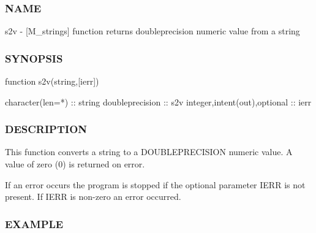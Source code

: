 \subsubsection*{N\+A\+ME}

s2v -\/ \mbox{[}M\+\_\+strings\mbox{]} function returns doubleprecision numeric value from a string 

\subsubsection*{S\+Y\+N\+O\+P\+S\+IS}

\begin{DoxyVerb}function s2v(string,[ierr])

 character(len=*)             :: string
 doubleprecision              :: s2v
 integer,intent(out),optional :: ierr
\end{DoxyVerb}


\subsubsection*{D\+E\+S\+C\+R\+I\+P\+T\+I\+ON}

This function converts a string to a D\+O\+U\+B\+L\+E\+P\+R\+E\+C\+I\+S\+I\+ON numeric value. A value of zero (0) is returned on error.

If an error occurs the program is stopped if the optional parameter I\+E\+RR is not present. If I\+E\+RR is non-\/zero an error occurred.

\subsubsection*{E\+X\+A\+M\+P\+LE}

